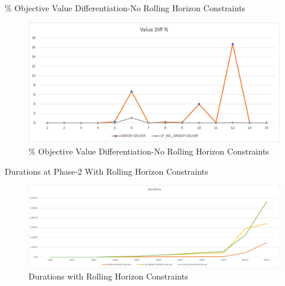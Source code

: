 \documentclass[11pt]{article}
\begin{document}
{\begin{landscape}
        \begin{table}[htb]
                \centering
                \caption[Short Caption for LoT]{\% Objective Value Differentiation-No Rolling Horizon Constraints}\label{table:tbl_test_obj_diff_no_rh}
        \end{table}
        \begin{figure}[htp]
            \centering
            \includegraphics[width=12cm]{value_diff_no_rh}
            \caption{\% Objective Value Differentiation-No Rolling Horizon Constraints}
            \label{fig:fig_value_diff_no_rh}
        \end{figure}
\newpage
        \begin{table}[htb]
                \centering
                \caption[Short Caption for LoT]{Durations at Phase-2 With Rolling Horizon Constraints}\label{table:tbl_test_durations_with_rh_ph2}
        \end{table}
        
        \begin{figure}[htp]
            \centering
            \includegraphics[width=20cm]{durations_with_rh}
            \caption{Durations with Rolling Horizon Constraints}
            \label{fig:fig_durations_with_rh}
        \end{figure}
        

\end{landscape}}
\end{document}
